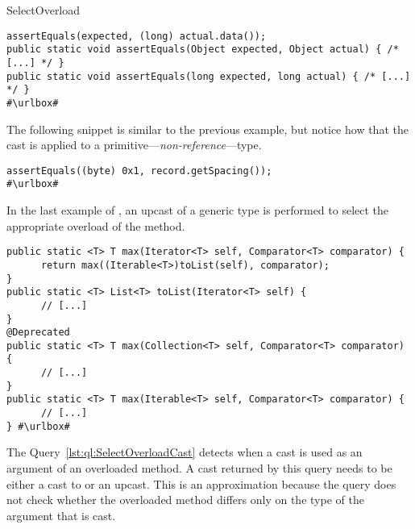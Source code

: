 \begin{pattern}{SelectOverload}
\def\urlvar{http://bit.ly/spullara_redis_protocol_2FC9Llb}
\begin{verbatim}
assertEquals(expected, (long) actual.data());
public static void assertEquals(Object expected, Object actual) { /* [...] */ }
public static void assertEquals(long expected, long actual) { /* [...] */ }
#\urlbox#
\end{verbatim}

The following snippet is similar to the previous example,
but notice how that the cast is applied to a
primitive---\emph{non-reference}---type.

\def\urlvar{http://bit.ly/apache_poi_2StrlOn}
\begin{verbatim}
assertEquals((byte) 0x1, record.getSpacing());
#\urlbox#
\end{verbatim}

In the last example of \thisp,
an upcast of a generic type is performed to select the appropriate overload of the  method.

\def\urlvar{http://bit.ly/groovy_groovy_core_2HDAkbF}
\begin{verbatim}
public static <T> T max(Iterator<T> self, Comparator<T> comparator) {
      return max((Iterable<T>)toList(self), comparator);
}
public static <T> List<T> toList(Iterator<T> self) {
      // [...]
}
@Deprecated
public static <T> T max(Collection<T> self, Comparator<T> comparator) {
      // [...]
}
public static <T> T max(Iterable<T> self, Comparator<T> comparator) {
      // [...]
} #\urlbox#
\end{verbatim}


\detection{}
The Query~\ref{lst:ql:SelectOverloadCast} detects when a cast is used as an argument of an overloaded method.
A cast returned by this query needs to be either a cast to  or an upcast.
This is an approximation because the query does not check whether the overloaded method differs only on the type of the argument that is cast.


\end{pattern}
